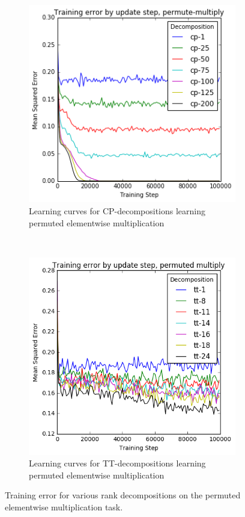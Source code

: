{\begin{figure}
	\begin{subfigure}[t]{0.45\textwidth}
		\includegraphics[width=\textwidth]{tensors/permute-cp-mom}
		\caption{Learning curves for CP-decompositions learning permuted 
		elementwise multiplication}
	\end{subfigure}
	~
	\begin{subfigure}[t]{0.45\textwidth}
		\includegraphics[width=\textwidth]{tensors/permute-tt-mom}
		\caption{Learning curves for TT-decompositions learning permuted
		 elementwise multiplication}
	\end{subfigure}
	\caption{Training error for various rank decompositions on the permuted
	elementwise multiplication
	task.}
	\label{fig:permute-multiply-ff}
\end{figure} 


}
